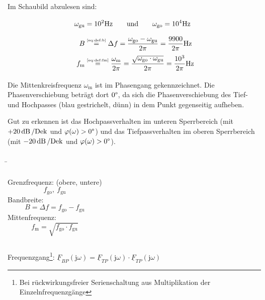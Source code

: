 \begin{frame}
{    Im Schaubild abzulesen sind:
    \begin{align}
        \omega_{\mathrm{gu}} &= 10^2\mathrm{Hz} \qquad \text{und} \qquad
            \omega_{\mathrm{go}} = 10^4\mathrm{Hz}\vphantom{\bigg|}\\
        B &\overset{\tiny\ref{eq:def:b}}{=} \Delta f = \frac{\omega_{\mathrm{go}} - \omega_{\mathrm{gu}}}{2\pi}
            = \frac{9900}{2\pi}\mathrm{Hz}\vphantom{\bigg|}\\
        f_{\mathrm{m}} &\overset{\tiny\ref{eq:def:fm}}{=} \frac{\omega_{\mathrm{m}}}{2\pi} 
            = \frac{\sqrt{\omega_{\mathrm{go}} \cdot \omega_{\mathrm{gu}}}}{2\pi} = \frac{10^3}{2\pi}\mathrm{Hz}\vphantom{\bigg|}
    \end{align}
    
    Die Mittenkreisfrequenz $\omega_{\mathrm{m}}$ ist im Phasengang gekennzeichnet.
    Die Phasenverschiebung beträgt dort $0\degree$, da sich die Phasenverschiebung des Tief- und Hochpasses
    (blau gestrichelt, dünn) in dem Punkt gegenseitig aufheben.

    Gut zu erkennen ist das Hochpassverhalten im unteren Sperrbereich (mit $+20\operatorname{dB}/\mathrm{Dek}$ und $\varphi(\omega) > 0\degree$)
    und das Tiefpassverhalten im oberen Sperrbereich (mit $-20\operatorname{dB}/\mathrm{Dek}$ und $\varphi(\omega) > 0\degree$).

}
\b{
    \begin{columns}[c]
        \centering%
            \hfill%

        \centering%
            \flushleft
            Grenzfrequenz: (obere, untere)
                \begin{equation*}f_{\mathrm{go}},\ f_{\mathrm{gu}} \end{equation*}
            Bandbreite:
                \begin{equation*}B = \Delta f = f_{\mathrm{go}} - f_{\mathrm{gu}}\end{equation*}
            Mittenfrequenz:
                \begin{equation*}f_{\mathrm{m}} = \sqrt{f_{\mathrm{go}} \cdot f_{\mathrm{gu}}}\end{equation*}
    \end{columns}
    Frequenzgang\footnote{Bei rückwirkungsfreier Serienschaltung aus Multiplikation der Einzelnfrequenzgänge}:%
    $\underline{F}_{BP}(\mathrm{j}\omega)=\underline{F}_{TP}(\mathrm{j}\omega)\cdot\underline{F}_{TP}(\mathrm{j}\omega)$%
}
\end{frame}

